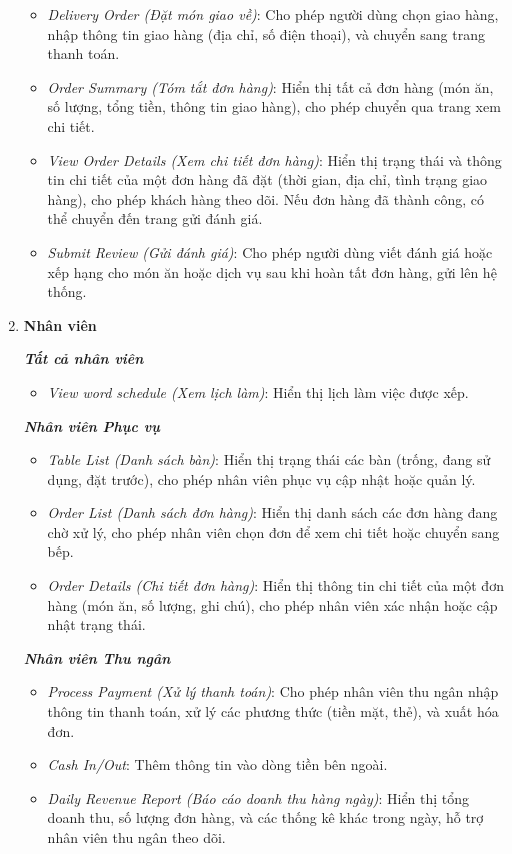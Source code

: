 \begin{enumerate}
\begin{itemize}
		      \item \textit{Delivery Order (Đặt món giao về)}: Cho phép người dùng chọn giao hàng, nhập thông tin giao hàng (địa chỉ, số điện thoại), và chuyển sang trang thanh toán.
		      \item \textit{Order Summary (Tóm tắt đơn hàng)}: Hiển thị tất cả đơn hàng (món ăn, số lượng, tổng tiền, thông tin giao hàng), cho phép chuyển qua trang xem chi tiết.
		      \item \textit{View Order Details (Xem chi tiết đơn hàng)}: Hiển thị trạng thái và thông tin chi tiết của một đơn hàng đã đặt (thời gian, địa chỉ, tình trạng giao hàng), cho phép khách hàng theo dõi. Nếu đơn hàng đã thành công, có thể chuyển đến trang gửi đánh giá.
		      \item \textit{Submit Review (Gửi đánh giá)}: Cho phép người dùng viết đánh giá hoặc xếp hạng cho món ăn hoặc dịch vụ sau khi hoàn tất đơn hàng, gửi lên hệ thống.
	      \end{itemize}
	\item \textbf{Nhân viên}

	      \textbf{\textit{Tất cả nhân viên}}
	      \begin{itemize}
		      \item \textit{View word schedule (Xem lịch làm)}: Hiển thị lịch làm việc được xếp.
	      \end{itemize}
	      \textbf{\textit{Nhân viên Phục vụ}}
	      \begin{itemize}
		      \item \textit{Table List (Danh sách bàn)}: Hiển thị trạng thái các bàn (trống, đang sử dụng, đặt trước), cho phép nhân viên phục vụ cập nhật hoặc quản lý.
		      \item \textit{Order List (Danh sách đơn hàng)}: Hiển thị danh sách các đơn hàng đang chờ xử lý, cho phép nhân viên chọn đơn để xem chi tiết hoặc chuyển sang bếp.
		      \item \textit{Order Details (Chi tiết đơn hàng)}: Hiển thị thông tin chi tiết của một đơn hàng (món ăn, số lượng, ghi chú), cho phép nhân viên xác nhận hoặc cập nhật trạng thái.
	      \end{itemize}

	      \textit{\textbf{Nhân viên Thu ngân}}
	      \begin{itemize}
		      \item \textit{Process Payment (Xử lý thanh toán)}: Cho phép nhân viên thu ngân nhập thông tin thanh toán, xử lý các phương thức (tiền mặt, thẻ), và xuất hóa đơn.
		      \item \textit{Cash In/Out}: Thêm thông tin vào dòng tiền bên ngoài.
		      \item \textit{Daily Revenue Report (Báo cáo doanh thu hàng ngày)}: Hiển thị tổng doanh thu, số lượng đơn hàng, và các thống kê khác trong ngày, hỗ trợ nhân viên thu ngân theo dõi.
	      \end{itemize}


\end{enumerate}
